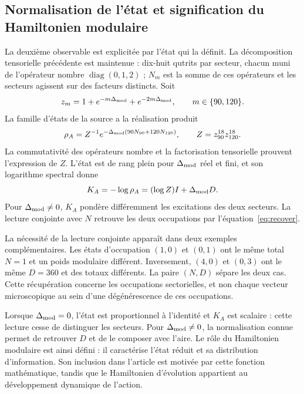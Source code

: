 \subsection{Normalisation de l'état et signification du Hamiltonien modulaire}
La deuxième observable est explicitée par l'état qui la définit.
La décomposition tensorielle précédente est maintenue : dix-huit qutrits
par secteur, chacun muni de l'opérateur nombre $\operatorname{diag}(0,1,2)$ ;
$N_m$ est la somme de ces opérateurs et les secteurs agissent sur des facteurs
distincts. Soit
\[
 z_m=1+e^{-m\Delta_{\rm mod}}+e^{-2m\Delta_{\rm mod}},
 \qquad m\in\{90,120\}.
\]
La famille d’états de la source a la réalisation produit
\[
 \rho_A=Z^{-1}e^{-\Delta_{\rm mod}(90N_{90}+120N_{120})},
 \qquad Z=z_{90}^{18}z_{120}^{18}.
\]
La commutativité des opérateurs nombre et la factorisation tensorielle
prouvent l'expression de $Z$. L'état est de rang plein pour
$\Delta_{\rm mod}$ réel et fini, et son logarithme spectral donne
\[
 K_A=-\log\rho_A=(\log Z)I+\Delta_{\rm mod}D.
\]
Pour $\Delta_{\rm mod}\ne0$, $K_A$ pondère différemment les excitations
des deux secteurs. La lecture conjointe avec $N$ retrouve les deux occupations
par l'équation~\eqref{eq:recover}.

La nécessité de la lecture conjointe apparaît dans deux exemples complémentaires.
Les états d'occupation $(1,0)$ et $(0,1)$ ont le même total $N=1$
et un poids modulaire différent. Inversement, $(4,0)$ et $(0,3)$ ont
le même $D=360$ et des totaux différents. La paire $(N,D)$ sépare les deux
cas. Cette récupération concerne les occupations sectorielles, et non
chaque vecteur microscopique au sein d'une dégénérescence de ces occupations.

Lorsque $\Delta_{\rm mod}=0$, l'état est proportionnel à l'identité
et $K_A$ est scalaire : cette lecture cesse de distinguer les secteurs.
Pour $\Delta_{\rm mod}\ne0$, la normalisation connue permet de retrouver
$D$ et de le composer avec l'aire. Le rôle du Hamiltonien
modulaire est ainsi défini : il caractérise l'état réduit et sa distribution d'information.
Son inclusion dans l'article est motivée par cette fonction mathématique,
tandis que le Hamiltonien d'évolution appartient au développement dynamique
de l'action.
